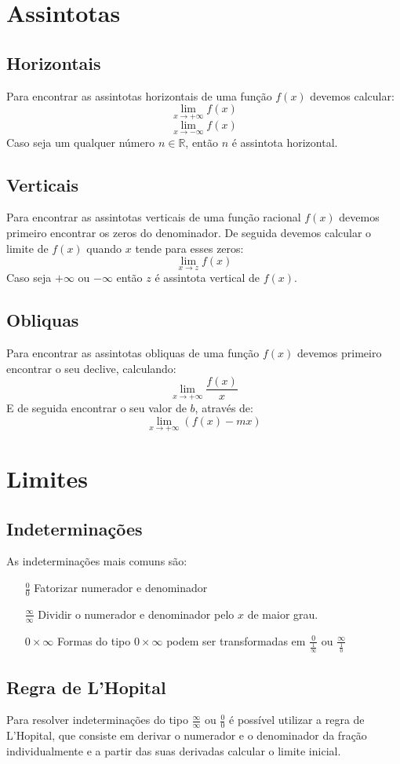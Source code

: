 \documentclass[10pt,a4paper]{report}
\begin{document}
\chapter{Assintotas}
\section{Horizontais}
Para encontrar as assintotas horizontais de uma função $f(x)$ devemos calcular:
$$
\lim_{x\rightarrow +\infty} f(x)
$$
$$
\lim_{x\rightarrow -\infty} f(x)
$$
Caso seja um qualquer número $n \in \mathbb{R}$, então $n$ é assintota horizontal.
\section{Verticais}
Para encontrar as assintotas verticais de uma função racional $f(x)$ devemos primeiro encontrar os zeros do denominador. De seguida devemos calcular o limite de $f(x)$ quando $x$ tende para esses zeros:
$$
\lim_{x \rightarrow z} f(x)
$$
Caso  seja $+\infty$ ou $-\infty$ então $z$ é assintota vertical de $f(x)$.
\section{Obliquas}
Para encontrar as assintotas obliquas de uma função $f(x)$ devemos primeiro encontrar o seu declive, calculando:
$$
\lim_{x \rightarrow +\infty} \frac{f(x)}{x}
$$
E de seguida encontrar o seu valor de $b$, através de:
$$
\lim_{x \rightarrow +\infty} (f(x)-mx)
$$

\chapter{Limites}
\section{Indeterminações}
As indeterminações mais comuns são:
\begin{itemize}
\item[$\frac{0}{0}$] Fatorizar numerador e denominador
\item[$\frac{\infty}{\infty}$] Dividir o numerador e denominador pelo $x$ de maior grau.
\item[$0 \times \infty$] Formas do tipo $0 \times \infty$ podem ser transformadas em $\frac{0}{\frac{1}{\infty}}$ ou $\frac{\infty}{\frac{1}{0}}$
\end{itemize}
\section{Regra de L'Hopital}
Para resolver indeterminações do tipo $\frac{\infty}{\infty}$ ou $\frac{0}{0}$ é possível utilizar a regra de L'Hopital, que consiste em derivar o numerador e o denominador da fração individualmente e a partir das suas derivadas calcular o limite inicial.
\end{document}
